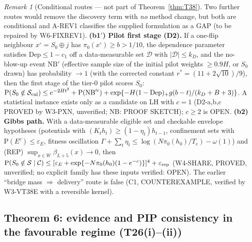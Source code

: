 \documentclass[11pt]{article}
\theoremstyle{definition}
\theoremstyle{remark}
\newtheorem{remark}{Remark}
\renewcommand{\Pr}{\mathrm{P}}
\newcommand{\Sz}{S_0}
\newcommand{\cC}{\mathcal C}
\newcommand{\cS}{\mathcal S}
\begin{document}
\begin{remark}[Conditional routes --- not part of Theorem~\ref{thm:T38}]\label{rem:routes}
Two further routes would remove the discovery term with \emph{no} method change, but both are conditional and A-REV1 classifies the supplied formulation as a GAP
(to be repaired by W6-FIXREV1). \textbf{(b1$'$) Pilot first stage (D2).} If a one-flip neighbour $x^\circ=\Sz\oplus j$ has $\pi_0(x^\circ)\ge b>1/10$, the dependence parameter satisfies $\mathrm{Dep}\le1-c_1$ off a data-measurable set $\mathcal D$ with $|\mathcal D|\le k_D$, and the no-blow-up event $\mathrm{NB}'$ (effective sample size of the initial pilot weights $\ge0.9H$, or $\Sz$ drawn) has probability $\to1$ (with the corrected constant $r^*=(11+2\sqrt{10})/9$), then the first stage of the tier-0 pilot scores $\Sz$: $\Pr(\Sz\notin\cS_{\rm cal})\le e^{-2Ht^2}+\Pr(\mathrm{NB}'^c)+\exp\{-H(1-\mathrm{Dep})_+g(b-t)/(k_D+B+3)\}$. A statistical instance exists only as a candidate on LH with $c=1$ (D2-a,b,c PROVED by W3-PXN, unverified; NB: PROOF SKETCH); $c\ge2$ is OPEN. \textbf{(b2) Gibbs path.} With a data-measurable eligible set and checkable envelope hypotheses (potentials with $(K_th_t)\ge(1-\eta_t)h_{t-1}$, confinement sets with $\Pr(E^c)\le\varepsilon_E$, fitness oscillation $\Gamma+\sum_t\eta_t\le\log(N\pi_0(h_0)/T_e)-\omega(1)$) and (REP) $\sup_{x\in W}\beta_{L+5}(x)\to0$, then $\Pr(\Sz\notin\cS\mid\cC)\le[\varepsilon_E+\exp\{-N\pi_0(h_0)(1-e^{-c})\}]^4+\varepsilon_{\rm rep}$ (W4-SHARE, PROVED, unverified; no explicit family has these inputs verified: OPEN). The earlier ``bridge mass $\Rightarrow$ delivery'' route is false (C1, COUNTEREXAMPLE, verified by W3-VT38E with a reversible kernel).
\end{remark}

\subsection{Theorem 6: evidence and PIP consistency in the favourable regime (T26(i)--(ii))}
\end{document}

